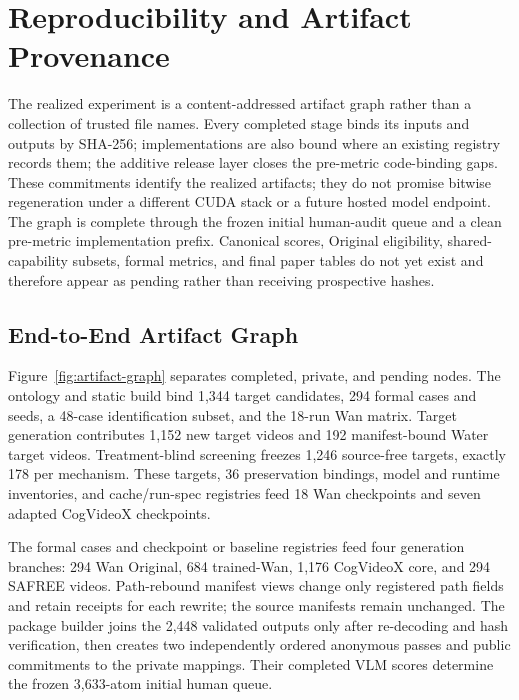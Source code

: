 \section{Reproducibility and Artifact Provenance}
\label{app:reproducibility}

The realized experiment is a content-addressed artifact graph rather than a
collection of trusted file names.  Every completed stage binds its inputs and
outputs by SHA-256; implementations are also bound where an existing registry
records them; the additive release layer closes the pre-metric code-binding
gaps.  These commitments identify the realized artifacts; they do not
promise bitwise regeneration under a different CUDA stack or a future hosted
model endpoint.  The graph is complete through the frozen initial human-audit
queue and a clean pre-metric implementation prefix.  Canonical scores,
Original eligibility, shared-capability subsets, formal metrics, and final
paper tables do not yet exist and therefore appear as pending rather than
receiving prospective hashes.

\subsection{End-to-End Artifact Graph}
\label{app:artifact-graph}

Figure~\ref{fig:artifact-graph} separates completed, private, and pending
nodes.  The ontology and static build bind 1,344 target candidates, 294 formal
cases and seeds, a 48-case identification subset, and the 18-run Wan matrix.
Target generation contributes 1,152 new target videos and 192 manifest-bound
Water target videos.  Treatment-blind screening freezes 1,246 source-free targets,
exactly 178 per mechanism.  These targets, 36 preservation bindings, model and
runtime inventories, and cache/run-spec registries feed 18 Wan checkpoints
and seven adapted CogVideoX checkpoints.

The formal cases and checkpoint or baseline registries feed four generation
branches: 294 Wan Original, 684 trained-Wan, 1,176 CogVideoX core, and 294
SAFREE videos.  Path-rebound manifest views change only registered path fields
and retain receipts for each rewrite; the source manifests remain unchanged.
The package builder joins the 2,448 validated outputs only after re-decoding
and hash verification, then creates two independently ordered anonymous
passes and public commitments to the private mappings.  Their completed VLM
scores determine the frozen 3,633-atom initial human queue.

